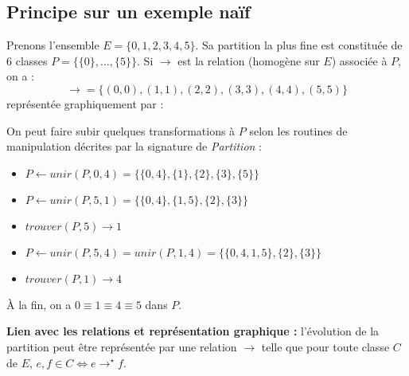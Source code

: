 \documentclass[../../../main.tex]{subfiles}
\begin{document}
\subsection{Principe sur un exemple naïf}
Prenons l'ensemble $E = \{0, 1, 2, 3, 4, 5\}$. Sa partition la plus fine est constituée de $6$ classes $P = \{\{0\}, \dots, \{5\}\}$. Si $\rightarrow$ est la relation (homogène sur $E$) associée à $P$, on a : $$\rightarrow = \{(0, 0), (1, 1), (2, 2), (3, 3), (4, 4), (5, 5)\}$$
représentée graphiquement par :
\begin{center}
\end{center}
On peut faire subir quelques transformations à $P$ selon les routines de manipulation décrites par la signature de \textit{Partition} :
\begin{itemize}
	\item $P\leftarrow unir(P, 0, 4) = \{\{0, 4\}, \{1\}, \{2\}, \{3\}, \{5\}\}$
	\item $P\leftarrow unir(P, 5, 1) = \{\{0, 4\}, \{1, 5\}, \{2\}, \{3\}\}$
	\item $trouver(P, 5) \rightarrow 1$
	\item $P \leftarrow unir(P, 5, 4) = unir(P, 1, 4) = \{\{0, 4, 1, 5\}, \{2\}, \{3\}\}$
	\item $trouver(P, 1) \rightarrow 4$
\end{itemize}
À la fin, on a $0\equiv 1\equiv 4\equiv 5$ dans $P$.

\textbf{Lien avec les relations et représentation graphique :} l'évolution de la partition peut être représentée par une relation $\rightarrow$ telle que pour toute classe $C$ de $E$, $e, f\in C \Leftrightarrow e\rightarrow^\star f$.
\end{document}

